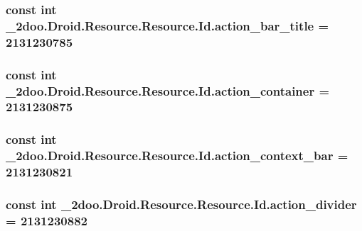 \hypertarget{class__2doo_1_1_droid_1_1_resource_1_1_id_ea2e3e620aac1e88770b36469675a2bb}{
\subsubsection[{action\_\-bar\_\-title}]{\setlength{\rightskip}{0pt plus 5cm}const int \_\-2doo.Droid.Resource.Resource.Id.action\_\-bar\_\-title = 2131230785}}
\label{class__2doo_1_1_droid_1_1_resource_1_1_id_ea2e3e620aac1e88770b36469675a2bb}


\hypertarget{class__2doo_1_1_droid_1_1_resource_1_1_id_40655e33b27e9df27de8a25e731d6f3b}{
\subsubsection[{action\_\-container}]{\setlength{\rightskip}{0pt plus 5cm}const int \_\-2doo.Droid.Resource.Resource.Id.action\_\-container = 2131230875}}
\label{class__2doo_1_1_droid_1_1_resource_1_1_id_40655e33b27e9df27de8a25e731d6f3b}


\hypertarget{class__2doo_1_1_droid_1_1_resource_1_1_id_9720ad62e2090bf8a659865451f7a423}{
\subsubsection[{action\_\-context\_\-bar}]{\setlength{\rightskip}{0pt plus 5cm}const int \_\-2doo.Droid.Resource.Resource.Id.action\_\-context\_\-bar = 2131230821}}
\label{class__2doo_1_1_droid_1_1_resource_1_1_id_9720ad62e2090bf8a659865451f7a423}


\hypertarget{class__2doo_1_1_droid_1_1_resource_1_1_id_29d3a82271da09b6b0ad02ee3b3aa933}{
\subsubsection[{action\_\-divider}]{\setlength{\rightskip}{0pt plus 5cm}const int \_\-2doo.Droid.Resource.Resource.Id.action\_\-divider = 2131230882}}
\label{class__2doo_1_1_droid_1_1_resource_1_1_id_29d3a82271da09b6b0ad02ee3b3aa933}


